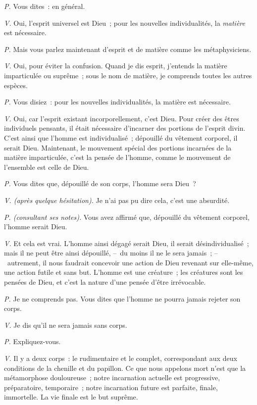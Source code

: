 \documentclass[french,twoside]{book} %
\begin{document}
\emph{P.} Vous dites : en général.\par
\emph{V.} Oui, l’esprit universel est Dieu ; pour les nouvelles individualités, la \emph{matière} est nécessaire.\par
\emph{P.} Mais vous parlez maintenant d’esprit et de matière comme les métaphysiciens.\par
\emph{V.} Oui, pour éviter la confusion. Quand je dis esprit, j’entends la matière imparticulée ou suprême ; sous le nom de matière, je comprends toutes les autres espèces.\par
\emph{P.} Vous disiez : pour les nouvelles individualités, la matière est nécessaire.\par
\emph{V.} Oui, car l’esprit existant incorporellement, c’est Dieu. Pour créer des êtres individuels pensants, il était nécessaire d’incarner des portions de l’esprit divin. C’est ainsi que l’homme est individualisé ; dépouillé du vêtement corporel, il serait Dieu. Maintenant, le mouvement spécial des portions incarnées de la matière imparticulée, c’est la pensée de l’homme, comme le mouvement de l’ensemble est celle de Dieu.\par
\emph{P.} Vous dites que, dépouillé de son corps, l’homme sera Dieu ?\par
\emph{V. (après quelque hésitation).} Je n’ai pas pu dire cela, c’est une absurdité.\par
\emph{P. (consultant ses notes).} Vous avez affirmé que, dépouillé du vêtement corporel, l’homme serait Dieu.\par
\emph{V.} Et cela est vrai. L’homme ainsi dégagé serait Dieu, il serait désindividualisé ; mais il ne peut être ainsi dépouillé, – du moins il ne le sera jamais ; – autrement, il nous faudrait concevoir une action de Dieu revenant sur elle-même, une action futile et sans but. L’homme est une créature ; les créatures sont les pensées de Dieu, et c’est la nature d’une pensée d’être irrévocable.\par
\emph{P.} Je ne comprends pas. Vous dites que l’homme ne pourra jamais rejeter son corps.\par
\emph{V.} Je dis qu’il ne sera jamais sans corps.\par
\emph{P.} Expliquez-vous.\par
\emph{V.} Il y a deux corps : le rudimentaire et le complet, correspondant aux deux conditions de la chenille et du papillon. Ce que nous appelons mort n’est que la métamorphose douloureuse ; notre incarnation actuelle est progressive, préparatoire, temporaire ; notre incarnation future est parfaite, finale, immortelle. La vie finale est le but suprême.\par
\end{document}
